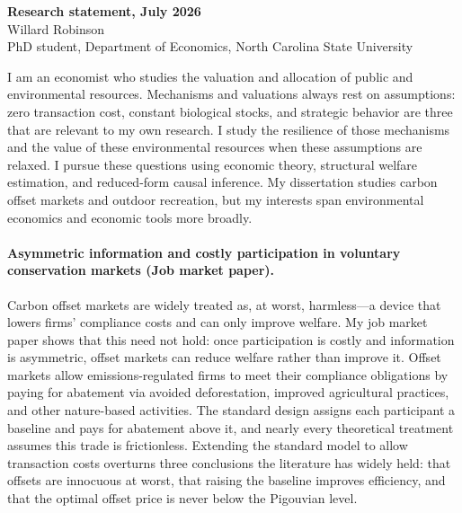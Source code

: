 \documentclass[12pt]{article}
\begin{document}
\begin{center}
    \large
    {\Large\bfseries Research statement, July 2026} \\
    \large Willard Robinson \\
    PhD student, Department of Economics, North Carolina State University
\end{center}

\smallskip

\noindent I am an economist who studies the valuation and allocation of public and environmental resources. Mechanisms and valuations always rest on assumptions: zero transaction cost, constant biological stocks, and strategic behavior are three that are relevant to my own research. I study the resilience of those mechanisms and the value of these environmental resources when these assumptions are relaxed. I pursue these questions using economic theory, structural welfare estimation, and reduced-form causal inference. My dissertation studies carbon offset markets and outdoor recreation, but my interests span environmental economics and economic tools more broadly.

\paragraph{Asymmetric information and costly participation in voluntary conservation markets (Job market paper).}

Carbon offset markets are widely treated as, at worst, harmless---a device that lowers firms' compliance costs and can only improve welfare. My job market paper shows that this need not hold: once participation is costly and information is asymmetric, offset markets can reduce welfare rather than improve it. Offset markets allow emissions-regulated firms to meet their compliance obligations by paying for abatement via avoided deforestation, improved agricultural practices, and other nature-based activities. The standard design assigns each participant a baseline and pays for abatement above it, and nearly every theoretical treatment assumes this trade is frictionless. Extending the standard model to allow transaction costs overturns three conclusions the literature has widely held: that offsets are innocuous at worst, that raising the baseline improves efficiency, and that the optimal offset price is never below the Pigouvian level.
\end{document}
